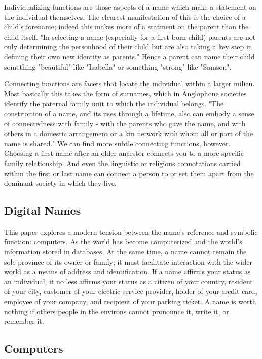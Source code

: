 Individualizing functions are those aspects of a name which make a statement on
the individual themselves. The clearest manifestation of this is the choice of a
child's forename; indeed this makes more of a statment on the parent than the
child itself. "In selecting a name (especially for a first-born child) parents
are not only determining the personhood of their child but are also taking a key
step in defining their own new identity as parents." \parencite[718]{finch08}
Hence a parent can name their child something "beautiful" like "Isabella" or
something "strong" like "Samson".

Connecting functions are facets that locate the individual within a larger
milieu. Most basically this takes the form of surnames, which in Anglophone
societies identify the paternal family unit to which the individual belongs.
"The construction of a name, and its uses through a lifetime, also can embody a
sense of connectedness with family - with the parents who gave the name, and
with others in a domestic arrangement or a kin network with whom all or part of
the name is shared." \parencite[711]{finch08} We can find more subtle connecting
functions, however. Choosing a first name after an older ancestor connects you
to a more specific family relationship. And even the linguistic or religious
connotations carried within the first or last name can connect a person to or
set them apart from the dominant society in which they live.

\subsection{Digital Names}

This paper explores a modern tension between the name's reference and symbolic
function: computers. As the world has become computerized and the world's
information stored in databases, At the same time, a name cannot remain the sole
province of its owner or family; it must facilitate interaction with the wider
world as a means of address and identification. If a name affirms your status as
an individual, it no less affirms your status as a citizen of your country,
resident of your city, customer of your electric service provider, holder of
your credit card, employee of your company, and recipient of your parking
ticket. A name is worth nothing if others people in the environs cannot
pronounce it, write it, or remember it.

\subsection{Computers}


